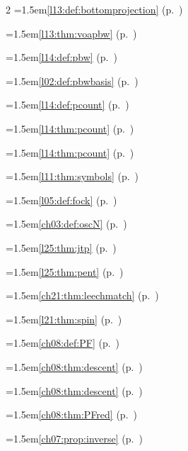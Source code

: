 \begin{multicols}{2}
\hangindent=1.5em\quad \ref{l13:def:bottomprojection} (p.~\pageref{l13:def:bottomprojection})\par
\hangindent=1.5em\quad \ref{l13:thm:voapbw} (p.~\pageref{l13:thm:voapbw})\par
\hangindent=1.5em\quad \ref{l14:def:pbw} (p.~\pageref{l14:def:pbw})\par
\hangindent=1.5em\quad \ref{l02:def:pbwbasis} (p.~\pageref{l02:def:pbwbasis})\par
\hangindent=1.5em\quad \ref{l14:def:pcount} (p.~\pageref{l14:def:pcount})\par
\hangindent=1.5em\quad \ref{l14:thm:pcount} (p.~\pageref{l14:thm:pcount})\par
\hangindent=1.5em\quad \ref{l14:thm:pcount} (p.~\pageref{l14:thm:pcount})\par
\hangindent=1.5em\quad \ref{l11:thm:symbols} (p.~\pageref{l11:thm:symbols})\par
\hangindent=1.5em\quad \ref{l05:def:fock} (p.~\pageref{l05:def:fock})\par
\hangindent=1.5em\quad \ref{ch03:def:oscN} (p.~\pageref{ch03:def:oscN})\par
\hangindent=1.5em\quad \ref{l25:thm:jtp} (p.~\pageref{l25:thm:jtp})\par
\hangindent=1.5em\quad \ref{l25:thm:pent} (p.~\pageref{l25:thm:pent})\par
\hangindent=1.5em\quad \ref{ch21:thm:leechmatch} (p.~\pageref{ch21:thm:leechmatch})\par
\hangindent=1.5em\quad \ref{l21:thm:spin} (p.~\pageref{l21:thm:spin})\par
\hangindent=1.5em\quad \ref{ch08:def:PF} (p.~\pageref{ch08:def:PF})\par
\hangindent=1.5em\quad \ref{ch08:thm:descent} (p.~\pageref{ch08:thm:descent})\par
\hangindent=1.5em\quad \ref{ch08:thm:descent} (p.~\pageref{ch08:thm:descent})\par
\hangindent=1.5em\quad \ref{ch08:thm:PFred} (p.~\pageref{ch08:thm:PFred})\par
\hangindent=1.5em\quad \ref{ch07:prop:inverse} (p.~\pageref{ch07:prop:inverse})\par

\end{multicols}
